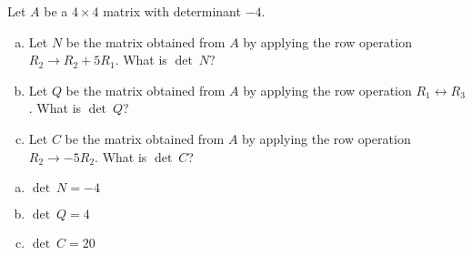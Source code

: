 
\begin{exerciseStatement}


Let \(A\) be a \(4 \times 4\) matrix with determinant \( -4 \).


\begin{enumerate}[(a)]
\item Let \(N\) be the matrix obtained from \(A\) by applying the row operation \( R_2 \to R_2 + 5R_1 \). What is \(\operatorname{det}\ N\)?
\item Let \(Q\) be the matrix obtained from \(A\) by applying the row operation \( R_1 \leftrightarrow R_3 \). What is \(\operatorname{det}\ Q\)?
\item Let \(C\) be the matrix obtained from \(A\) by applying the row operation \( R_2 \to -5R_2 \). What is \(\operatorname{det}\ C\)?
\end{enumerate}
    
\end{exerciseStatement}
    
\begin{exerciseAnswer} 

\begin{enumerate}[(a)]
\item \(\operatorname{det}\ N= -4 \)
\item \(\operatorname{det}\ Q= 4 \)
\item \(\operatorname{det}\ C= 20 \)
\end{enumerate}
    
\end{exerciseAnswer}
    
